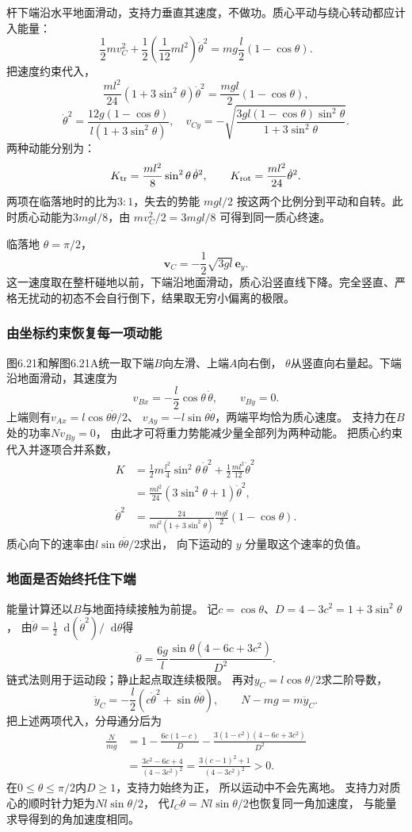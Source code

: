 \documentclass[UTF8,fontset=fandol,a4paper,11pt]{ctexart}
\newcommand{\dd}{\mathop{}\!\mathrm{d}}
\newcommand{\result}[1]{\begin{equation*}\boxed{#1}\end{equation*}}
\begin{document}
杆下端沿水平地面滑动，支持力垂直其速度，不做功。质心平动与绕心转动都应计入能量：
\[
 \frac12mv_C^2+\frac12\left(\frac1{12}ml^2\right)\dot\theta^2
 =mg\frac l2(1-\cos\theta).
\]
把速度约束代入，
\[
 \frac{ml^2}{24}(1+3\sin^2\theta)\dot\theta^2
 =\frac{mgl}{2}(1-\cos\theta),
\]
\[
 \dot\theta^2=\frac{12g(1-\cos\theta)}{l(1+3\sin^2\theta)},
 \quad v_{Cy}=-\sqrt{\frac{3gl(1-\cos\theta)\sin^2\theta}{1+3\sin^2\theta}}.
\]
两种动能分别为：
\[K_{\rm tr}=\frac{ml^2}{8}\sin^2\theta\,\dot\theta^2,
\qquad K_{\rm rot}=\frac{ml^2}{24}\dot\theta^2.\]
两项在临落地时的比为$3:1$，失去的势能 $mgl/2$ 按这两个比例分到平动和自转。此时质心动能为$3mgl/8$，由 $mv_C^2/2=3mgl/8$ 可得到同一质心终速。

临落地 $\theta=\pi/2$，
\[\result{\boldsymbol v_C=-\frac12\sqrt{3gl}\,\boldsymbol e_y.}\]
这一速度取在整杆碰地以前，下端沿地面滑动，质心沿竖直线下降。完全竖直、严格无扰动的初态不会自行倒下，结果取无穷小偏离的极限。
\subsubsection*{由坐标约束恢复每一项动能}
图6.21和解图6.21A统一取下端$B$向左滑、上端$A$向右倒，
$\theta$从竖直向右量起。下端沿地面滑动，其速度为
\[
v_{Bx}=-\frac l2\cos\theta\,\dot\theta,\qquad v_{By}=0.
\]
上端则有$v_{Ax}=l\cos\theta\dot\theta/2$、
$v_{Ay}=-l\sin\theta\dot\theta$，两端平均恰为质心速度。
支持力在$B$处的功率$N v_{By}=0$，
由此才可将重力势能减少量全部列为两种动能。
把质心约束代入并逐项合并系数，
\[
\begin{aligned}
K&=\frac12m\frac{l^2}{4}\sin^2\theta\,\dot\theta^2
 +\frac12\frac{ml^2}{12}\dot\theta^2\\
 &=\frac{ml^2}{24}(3\sin^2\theta+1)\dot\theta^2,\\
\dot\theta^2&=\frac{24}{ml^2(1+3\sin^2\theta)}
 \frac{mgl}{2}(1-\cos\theta).
\end{aligned}
\]
质心向下的速率由$l\sin\theta\dot\theta/2$求出，
向下运动的 $y$ 分量取这个速率的负值。

\subsubsection*{地面是否始终托住下端}
能量计算还以$B$与地面持续接触为前提。
记$c=\cos\theta$、$D=4-3c^2=1+3\sin^2\theta$，
由$\ddot\theta=\tfrac12\dd(\dot\theta^2)/\dd\theta$得
\[
\ddot\theta=\frac{6g}{l}
\frac{\sin\theta(4-6c+3c^2)}{D^2}.
\]
链式法则用于运动段；静止起点取连续极限。
再对$y_C=l\cos\theta/2$求二阶导数，
\[
\ddot y_C=-\frac l2\left(c\dot\theta^2+
\sin\theta\ddot\theta\right),\qquad N-mg=m\ddot y_C.
\]
把上述两项代入，分母通分后为
\[
\begin{aligned}
\frac{N}{mg}
&=1-\frac{6c(1-c)}{D}
 -\frac{3(1-c^2)(4-6c+3c^2)}{D^2}\\
&=\frac{3c^2-6c+4}{(4-3c^2)^2}
 =\frac{3(c-1)^2+1}{(4-3c^2)^2}>0.
\end{aligned}
\]
在$0\leq\theta\leq\pi/2$内$D\geq1$，支持力始终为正，
所以运动中不会先离地。
支持力对质心的顺时针力矩为$Nl\sin\theta/2$，
代$I_C\ddot\theta=Nl\sin\theta/2$也恢复同一角加速度，
与能量求导得到的角加速度相同。
\end{document}
